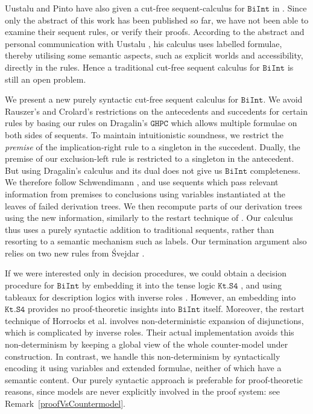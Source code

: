 \documentclass{llncs}
\numberwithin{equation}{section}
\newcommand{\Lg}[1]{\mathtt{#1}}
\newcommand {\BiInt}{
        \Lg{BiInt}
}
\newcommand {\GHPC}{
        \Lg{GHPC}
}
\newcommand {\KtSFour}{
        \Lg{Kt.S4}
}
\begin{document}
Uustalu and Pinto have also given a cut-free sequent-calculus for $\BiInt$ in \cite{uustalu2006a}. Since only the abstract of this work has been published so far, we have not been able to examine their sequent rules, or verify their proofs. According to the abstract \cite{uustalu2006a} and personal communication with Uustalu \cite{uustalu2006}, his calculus uses labelled formulae, thereby utilising some semantic aspects, such as explicit worlds and accessibility, directly in the rules. Hence a traditional cut-free sequent calculus for $\BiInt$ is still an open problem.

We present a new purely syntactic cut-free sequent calculus for
$\BiInt$. We avoid
Rauszer's and Crolard's restrictions on the 
antecedents and succedents for certain rules by basing our rules on
Dragalin's $\GHPC$ \cite{dragalin1988} which allows multiple formulae
on both sides of sequents. To maintain intuitionistic soundness, we
restrict 
the \emph{premise} of the implication-right
rule
to a singleton in the succedent. Dually, the
premise of our exclusion-left rule is restricted to a singleton in the
antecedent.
But using Dragalin's calculus and its dual does not give us
$\BiInt$ completeness. We therefore follow Schwendimann
\cite{schwendimann98}, and use sequents which pass relevant
information from premises to conclusions using variables instantiated
at the leaves of failed derivation trees. We then recompute parts of our derivation trees using the new information, similarly to the restart technique of \cite{horrocks1998}. Our calculus thus uses a
purely syntactic addition to traditional sequents, rather than resorting to a semantic
mechanism such as labels. Our termination argument also relies on two
new rules from \'{S}vejdar \cite{svejdar2006}.

If we were interested only in decision procedures, we could obtain a decision procedure for $\BiInt$ by embedding it
into the tense logic $\KtSFour$ \cite{wolter98}, and using tableaux for description logics with inverse roles 
\cite{horrocks1998}. However, an embedding into $\KtSFour$ provides no proof-theoretic insights into $\BiInt$ itself. Moreover, the restart technique of Horrocks et al. \cite{horrocks1998} involves
non-deterministic expansion of disjunctions, which is complicated by
inverse roles. Their actual implementation avoids this non-determinism by keeping a global view of the whole counter-model under construction. In contrast, we handle this non-determinism by syntactically encoding it using variables and extended formulae, neither of which have a semantic content. Our purely syntactic approach is preferable for proof-theoretic reasons, since models are never explicitly involved in the proof system: see Remark~\ref{proofVsCountermodel}.
\end{document}
